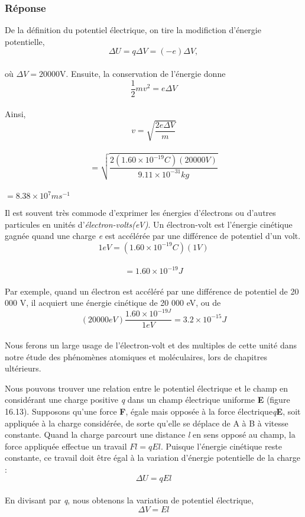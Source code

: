 \documentclass[../main.tex]{subfiles}
\begin{document}
\subsubsection{Réponse}
De la définition du potentiel électrique, on tire la modifiction d'énergie potentielle,\\
$$\Delta U = q\Delta V = (-e)\Delta V,$$\\
où $\Delta V = 20 000$V. Ensuite, la conservation de l'énergie donne\\
$$\frac{1}{2}mv^2 = e\Delta V$$\\
Ainsi,\\
$$v = \sqrt{\frac{2e\Delta V}{m}}$$\\
$$= \sqrt{\frac{2(1.60 \times 10^{-19}C)(20 000V)}{9.11 \times 10^{-31}kg}}$$\\
$= 8.38 \times 10^7 ms^{-1}$\\
\par Il est souvent très commode d'exprimer les énergies d'électrons ou d'autres particules en unités d'\textit{électron-volts(eV)}. Un électron-volt est l'énergie cinétique gagnée quand une charge \textit{e} est accélérée par une différence de potentiel d'un volt.\\
$$1eV = (1.60 \times 10^{-19}C)(1 V)$$\\
$$= 1.60 \times 10^{-19} J$$\\
Par exemple, quand un électron est accéléré par une différence de potentiel de 20 000 V, il acquiert une énergie cinétique de 20 000 eV, ou de \\
$$(20 000 eV)\frac{1.60 \times 10^{-19J}}{1eV} = 3.2 \times 10^{-15}J$$\\
Nous ferons un large usage de l'électron-volt et des multiples de cette unité dans notre étude des phénomènes atomiques et moléculaires, lors de chapitres ultérieurs.\\
\par Nous pouvons trouver une relation entre le potentiel électrique et le champ en considérant une charge positive \textit{q} dans un champ électrique uniforme \textbf{E} (figure 16.13). Supposons qu'une force \textbf{F}, égale mais opposée à la force électrique\textit{q}\textbf{E}, soit appliquée à la charge considérée, de sorte qu'elle se déplace de A à B à vitesse constante. Quand la charge parcourt une distance \textit{l} en sens opposé au champ, la force appliquée effectue un travail $Fl = qEl$. Puisque l'énergie cinétique reste constante, ce travail doit être égal à la variation d'énergie potentielle de la charge : \\
$$\Delta U = qEl$$\\
En divisant par \textit{q}, nous obtenons la variation de potentiel électrique,\\
$$\Delta V = El$$\\
\end{document}

